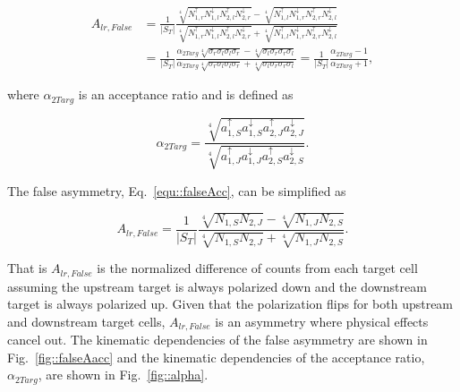 \begin{align}
  \label{equ::falseAcc}
  A_{lr,False} &= 
    \frac{1}{|S_T|}
    \frac{
      \sqrt[4]{
        N_{1,r}^\uparrow N_{1, l}^\downarrow
        N_{2,l}^\uparrow N_{2, r}^\downarrow
      } 
      -\sqrt[4]{
        N_{1,l}^\uparrow N_{1, r}^\downarrow
        N_{2,r}^\uparrow N_{2, l}^\downarrow
      }
    }{
      \sqrt[4]{
        N_{1,r}^\uparrow N_{1, l}^\downarrow
        N_{2,l}^\uparrow N_{2, r}^\downarrow
      } +
      \sqrt[4]{
        N_{1,l}^\uparrow N_{1, r}^\downarrow
        N_{2,r}^\uparrow N_{2, l}^\downarrow
      }
    } \\ \nonumber
    & =
    \frac{1}{|S_T|}
    \frac{
      \alpha_{2Targ} \sqrt[4]{\sigma_r\sigma_l\sigma_l\sigma_r} -
      \sqrt[4]{\sigma_l\sigma_r\sigma_r\sigma_l}
    }{
      \alpha_{2Targ} \sqrt[4]{\sigma_r\sigma_l\sigma_l\sigma_r} +
      \sqrt[4]{\sigma_l\sigma_r\sigma_r\sigma_l}
    }
    = \frac{1}{|S_T|}
    \frac{
      \alpha_{2Targ} - 1     
    }{
      \alpha_{2Targ} + 1
    },
\end{align}

\noindent
where $\alpha_{2Targ}$ is an acceptance ratio and is defined as

\begin{equation} \label{equ::alphaAcc}
  \alpha_{2Targ} =
  \frac{ \sqrt[4]{ a^\uparrow_{1,S}a^\downarrow_{1,S}
      a^\uparrow_{2,J}a^\downarrow_{2,J}}
  }{
    \sqrt[4]{
      a^\uparrow_{1,J} a^\downarrow_{1,J}
      a^\uparrow_{2,S} a^\downarrow_{2,S}
    }
  }.
\end{equation}

\noindent
The false asymmetry, Eq.~\ref{equ::falseAcc}, can be simplified as

\begin{equation}
  A_{lr,False} = 
  \frac{1}{|S_T|}
  \frac{
    \sqrt[4]{ N_{1, S} N_{2, J} }
    - \sqrt[4]{ N_{1, J} N_{2, S} }
  }{
    \sqrt[4]{ N_{1, S} N_{2, J} }
    + \sqrt[4]{ N_{1, J} N_{2, S} }
  }.
\end{equation}

\noindent
That is $A_{lr,False}$ is the normalized difference of counts from each
target cell assuming the upstream target is always polarized down and the
downstream target is always polarized up.  Given that the polarization flips for
both upstream and downstream target cells, $A_{lr,False}$ is an
asymmetry where physical effects cancel out.  The kinematic dependencies of the
false asymmetry are shown in Fig.~\ref{fig::falseAacc} and the kinematic
dependencies of the acceptance ratio, $\alpha_{2Targ}$, are shown in
Fig.~\ref{fig::alpha}.

